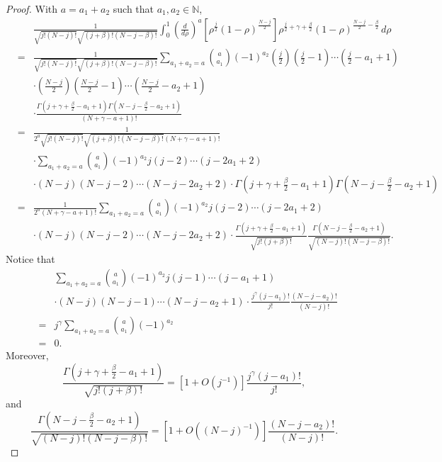 \documentclass[10pt,a4paper]{amsart}
\newcommand\N{\mathbb{N}}
\begin{document}
\begin{proof}
With $a=a_1+a_2$ such that $a_1,a_2\in\N$, 
\begin{eqnarray*}
&&\frac{1}{\sqrt{j!(N-j)!}\sqrt{(j+\beta)!(N-j-\beta)!}}\int_0^1\left(\frac{d}{d\rho}\right)^a\left[\rho^\frac j2(1-\rho)^{\frac{N-j}{2}}\right]\rho^{\frac j2+\gamma+\frac\beta2}(1-\rho)^{\frac{N-j}{2}-\frac\beta2}\,d\rho\\
&=&\frac{1}{\sqrt{j!(N-j)!}\sqrt{(j+\beta)!(N-j-\beta)!}}\sum_{a_1+a_2=a}{a\choose a_1}(-1)^{a_2}\left(\frac j2\right)\left(\frac j2-1\right)\cdots\left(\frac j2-a_1+1\right)\\
&&\cdot\left(\frac{N-j}{2}\right)\left(\frac{N-j}{2}-1\right)\cdots\left(\frac{N-j}{2}-a_2+1\right)\\
&&\cdot\frac{\Gamma\left(j+\gamma+\frac\beta2-a_1+1\right)\Gamma\left(N-j-\frac\beta2-a_2+1\right)}{(N+\gamma-a+1)!}\\
&=&\frac{1}{2^a\sqrt{j!(N-j)!}\sqrt{(j+\beta)!(N-j-\beta)!}(N+\gamma-a+1)!}\\
&&\cdot\sum_{a_1+a_2=a}{a\choose a_1}(-1)^{a_2}j(j-2)\cdots\left(j-2a_1+2\right)\\
&&\cdot(N-j)(N-j-2)\cdots\left(N-j-2a_2+2\right)\cdot\Gamma\left(j+\gamma+\frac\beta2-a_1+1\right)\Gamma\left(N-j-\frac\beta2-a_2+1\right)\\
&=&\frac{1}{2^a(N+\gamma-a+1)!}\sum_{a_1+a_2=a}{a\choose a_1}(-1)^{a_2}j(j-2)\cdots\left(j-2a_1+2\right)\\
&&\cdot(N-j)(N-j-2)\cdots\left(N-j-2a_2+2\right)\cdot\frac{\Gamma\left(j+\gamma+\frac\beta2-a_1+1\right)}{\sqrt{j!(j+\beta)!}}\frac{\Gamma\left(N-j-\frac\beta2-a_2+1\right)}{\sqrt{(N-j)!(N-j-\beta)!}}.
\end{eqnarray*}
Notice that 
\begin{eqnarray*}
&&\sum_{a_1+a_2=a}{a\choose a_1}(-1)^{a_2}j(j-1)\cdots\left(j-a_1+1\right)\\
&&\cdot(N-j)(N-j-1)\cdots\left(N-j-a_2+1\right)\cdot\frac{j^\gamma\left(j-a_1\right)!}{j!}\frac{\left(N-j-a_2\right)!}{(N-j)!}\\
&=&j^\gamma\sum_{a_1+a_2=a}{a\choose a_1}(-1)^{a_2}\\
&=&0.
\end{eqnarray*}
Moreover,
$$\frac{\Gamma\left(j+\gamma+\frac\beta2-a_1+1\right)}{\sqrt{j!(j+\beta)!}}=\left[1+O\left(j^{-1}\right)\right]\frac{j^\gamma\left(j-a_1\right)!}{j!},$$
and
$$\frac{\Gamma\left(N-j-\frac\beta2-a_2+1\right)}{\sqrt{(N-j)!(N-j-\beta)!}}=\left[1+O\left((N-j)^{-1}\right)\right]\frac{\left(N-j-a_2\right)!}{(N-j)!}.$$

\end{proof}
\end{document}
